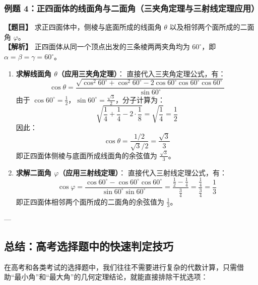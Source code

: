 \documentclass[11pt,a4paper]{ctexart}
\begin{document}
\subsubsection{例题 4：正四面体的线面角与二面角（三夹角定理与三射线定理应用）}
\textbf{【题目】} 求正四面体中，侧棱与底面所成的线面角 $\theta$ 以及相邻两个面所成的二面角 $\varphi$。\\
\textbf{【解析】} 正四面体从同一个顶点出发的三条棱两两夹角均为 $60^\circ$，即 $\alpha = \beta = \gamma = 60^\circ$。
\begin{enumerate}
    \item \textbf{求解线面角 $\theta$（应用三夹角定理）}：
    直接代入三夹角定理公式，有：
    \[ \cos\theta = \frac{\sqrt{\cos^2 60^\circ + \cos^2 60^\circ - 2\cos 60^\circ \cos 60^\circ \cos 60^\circ}}{\sin 60^\circ} \]
    由于 $\cos 60^\circ = \frac{1}{2}$，$\sin 60^\circ = \frac{\sqrt{3}}{2}$，分子计算为：
    \[ \sqrt{\frac{1}{4} + \frac{1}{4} - 2 \cdot \frac{1}{8}} = \sqrt{\frac{1}{4}} = \frac{1}{2} \]
    因此：
    \[ \cos\theta = \frac{1/2}{\sqrt{3}/2} = \frac{\sqrt{3}}{3} \]
    即正四面体侧棱与底面所成线面角的余弦值为 $\frac{\sqrt{3}}{3}$。
    
    \item \textbf{求解二面角 $\varphi$（应用三射线定理）}：
    直接代入三射线定理公式，有：
    \[ \cos\varphi = \frac{\cos 60^\circ - \cos 60^\circ \cos 60^\circ}{\sin 60^\circ \sin 60^\circ} = \frac{\frac{1}{2} - \frac{1}{4}}{\frac{3}{4}} = \frac{\frac{1}{4}}{\frac{3}{4}} = \frac{1}{3} \]
    即正四面体相邻两个面所成的二面角的余弦值为 $\frac{1}{3}$。
\end{enumerate}

---

\subsection{总结：高考选择题中的快速判定技巧}

在高考和各类考试的选择题中，我们往往不需要进行复杂的代数计算，只需借助“最小角”和“最大角”的几何定理结论，就能直接排除干扰选项：
\end{document}
